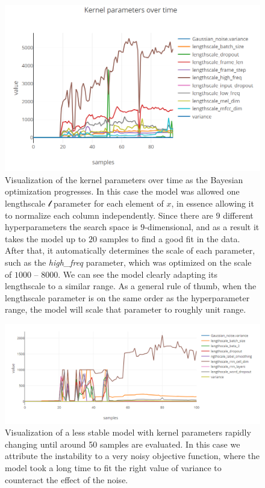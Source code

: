 \begin{figure}
	\begin{center}
		\includegraphics[width=1.0\textwidth]{images/kernel-params-over-time.png}
		\caption{Visualization of the kernel parameters over time as the Bayesian optimization progresses. In this case the model was allowed one lengthscale $\mathcal{l}$ parameter for each element of $x$, in essence allowing it to normalize each column independently. Since there are $9$ different hyperparameters the search space is $9$-dimensional, and as a result it takes the model up to $20$ samples to find a good fit in the data. After that, it automatically determines the scale of each parameter, such as the \emph{high\_freq} parameter, which was optimized on the scale of $1000$ -- $8000$. We can see the model clearly adapting its lengthscale to a similar range. As a general rule of thumb, when the lengthscale parameter is on the same order as the hyperparameter range, the model will scale that parameter to roughly unit range.}
		\label{figure:kernel-parameters-over-time}
	\end{center}
\end{figure}

\begin{figure}
	\begin{center}
		\includegraphics[width=1.0\textwidth]{images/kernel-parameters-over-time-jumpy.png}
		\caption{Visualization of a less stable model with kernel parameters rapidly changing until around 50 samples are evaluated. In this case we attribute the instability to a very noisy objective function, where the model took a long time to fit the right value of variance to counteract the effect of the noise.}
		\label{figure:kernel-parameters-over-time-jumpy}
	\end{center}
\end{figure}

